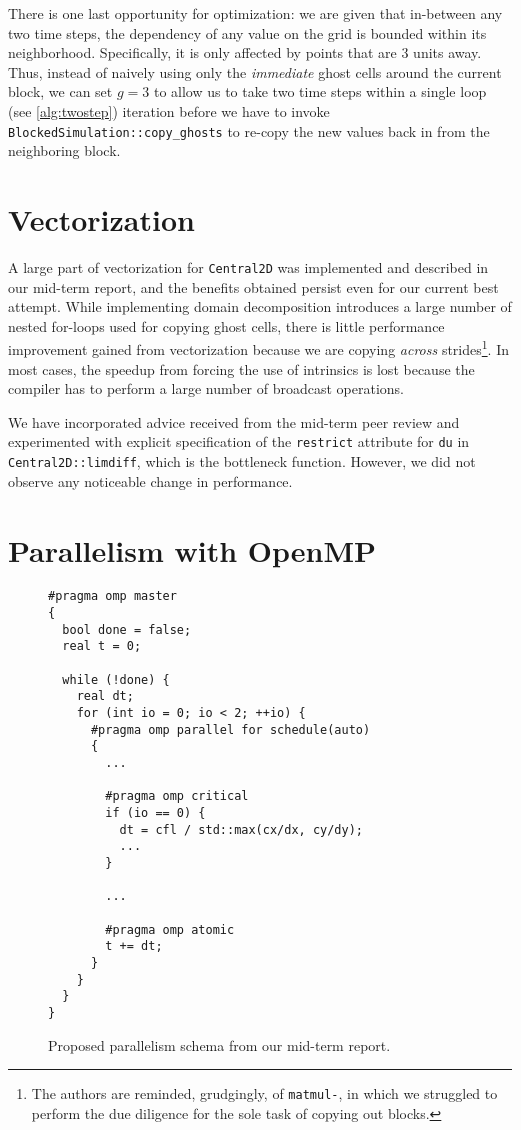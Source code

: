 \documentclass{scrartcl}
\begin{document}
  There is one last opportunity for optimization: we are given that in-between any two time steps, the dependency of any value on the grid is bounded within its neighborhood. Specifically, it is only affected by points that are 3 units away. Thus, instead of naively using only the \emph{immediate} ghost cells around the current block, we can set $g = 3$ to allow us to take two time steps within a single loop (see \autoref{alg:twostep}) iteration before we have to invoke \texttt{BlockedSimulation::copy\_ghosts} to re-copy the new values back in from the neighboring block.

  \section{Vectorization}
  A large part of vectorization for \texttt{Central2D} was implemented and described in our mid-term report, and the benefits obtained persist even for our current best attempt. While implementing domain decomposition introduces a large number of nested for-loops used for copying ghost cells, there is little performance improvement gained from vectorization because we are copying \emph{across} strides\footnote{The authors are reminded, grudgingly, of \texttt{matmul-}, in which we struggled to perform the due diligence for the sole task of copying out blocks.}. In most cases, the speedup from forcing the use of intrinsics is lost because the compiler has to perform a large number of broadcast operations.

  We have incorporated advice received from the mid-term peer review and experimented with explicit specification of the \texttt{restrict} attribute for \texttt{du} in \texttt{Central2D::limdiff}, which is the bottleneck function. However, we did not observe any noticeable change in performance.

  \section{Parallelism with OpenMP}
  \begin{figure}[p]
  \begin{lstlisting}
#pragma omp master
{
  bool done = false;
  real t = 0;

  while (!done) {
    real dt;
    for (int io = 0; io < 2; ++io) {
      #pragma omp parallel for schedule(auto)
      {
        ...

        #pragma omp critical
        if (io == 0) {
          dt = cfl / std::max(cx/dx, cy/dy);
          ...
        }

        ...

        #pragma omp atomic
        t += dt;
      }
    }
  }
}
  \end{lstlisting}
  \cprotect\caption{Proposed parallelism schema from our mid-term report.\label{alg:master}}
  \end{figure}
\end{document}
